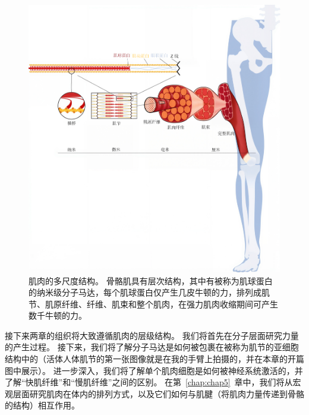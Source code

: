 \begin{figure}[!htb]
	\centering
	\includegraphics[width=1.0\linewidth]{chap4/4_2}
	\caption{肌肉的多尺度结构。
		骨骼肌具有层次结构，其中有被称为肌球蛋白的纳米级分子马达，每个肌球蛋白仅产生几皮牛顿的力，排列成肌节、肌原纤维、纤维、肌束和整个肌肉，在强力肌肉收缩期间可产生数千牛顿的力。 \label{fig:4_2}}
\end{figure}


接下来两章的组织将大致遵循肌肉的层级结构。
我们将首先在分子层面研究力量的产生过程。
接下来，我们将了解分子马达是如何被包裹在被称为肌节的亚细胞结构中的（活体人体肌节的第一张图像就是在我的手臂上拍摄的，并在本章的开篇图中展示）。
进一步深入，我们将了解单个肌肉细胞是如何被神经系统激活的，并了解“快肌纤维”和“慢肌纤维”之间的区别。
在第~\ref{chap:chap5}~章中，我们将从宏观层面研究肌肉在体内的排列方式，以及它们如何与肌腱（将肌肉力量传递到骨骼的结构）相互作用。




